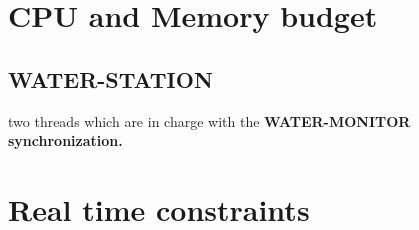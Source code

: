 \section {CPU and Memory budget}

\subsection {WATER-STATION}




























two threads which are in charge with the \bf{WATER-MONITOR} synchronization.






 
\section {Real time constraints}

